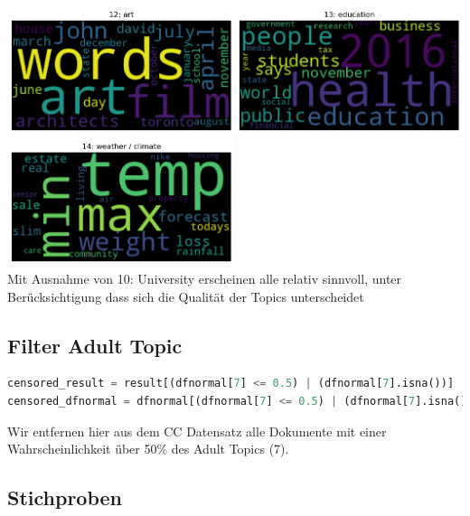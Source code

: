 \includegraphics[width=0.5\textwidth]{images/cc12.png}\includegraphics[width=0.5\textwidth]{images/cc13.png} \\
\includegraphics[width=0.5\textwidth]{images/cc14.png} \\

\noindent Mit Ausnahme von 10: University erscheinen alle relativ sinnvoll, unter Berücksichtigung dass sich die Qualität der Topics unterscheidet

\subsection{Filter Adult Topic}

{\color{MidnightBlue}
\begin{lstlisting}[language=python]
censored_result = result[(dfnormal[7] <= 0.5) | (dfnormal[7].isna())]
censored_dfnormal = dfnormal[(dfnormal[7] <= 0.5) | (dfnormal[7].isna())]
\end{lstlisting}}

\noindent Wir entfernen hier aus dem CC Datensatz alle Dokumente mit einer Wahrscheinlichkeit über 50\% des Adult Topics (7).

\subsection{Stichproben}

